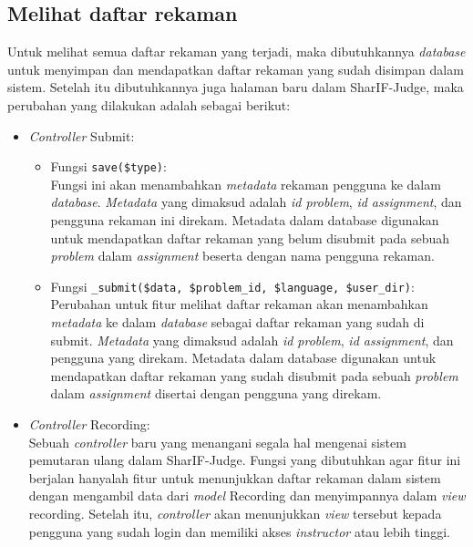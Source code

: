 \subsection{Melihat daftar rekaman}
\label{sub:4:3:melihatdaftarrekaman}

Untuk melihat semua daftar rekaman yang terjadi, maka dibutuhkannya \textit{database} untuk menyimpan dan mendapatkan daftar rekaman yang sudah disimpan dalam sistem. Setelah itu dibutuhkannya juga halaman baru dalam SharIF-Judge, maka perubahan yang dilakukan adalah sebagai berikut:

\begin{itemize}
    \item \textit{Controller} Submit:
          \begin{itemize}
              \item Fungsi \verb|save($type)|: \\
                    Fungsi ini akan menambahkan \textit{metadata} rekaman pengguna ke dalam \textit{database}. \textit{Metadata} yang dimaksud adalah \textit{id problem}, \textit{id assignment}, dan pengguna rekaman ini direkam. Metadata dalam database digunakan untuk mendapatkan daftar rekaman yang belum disubmit pada sebuah \textit{problem} dalam \textit{assignment} beserta dengan nama pengguna rekaman.
              \item Fungsi \verb|_submit($data, $problem_id, $language, $user_dir)|: \\
                    Perubahan untuk fitur melihat daftar rekaman akan menambahkan \textit{metadata} ke dalam \textit{database} sebagai daftar rekaman yang sudah di submit. \textit{Metadata} yang dimaksud adalah \textit{id problem}, \textit{id assignment}, dan pengguna yang direkam. Metadata dalam database digunakan untuk mendapatkan daftar rekaman yang sudah disubmit pada sebuah \textit{problem} dalam \textit{assignment} disertai dengan pengguna yang direkam.
          \end{itemize}
    \item \textit{Controller} Recording: \\
          Sebuah \textit{controller} baru yang menangani segala hal mengenai sistem pemutaran ulang dalam SharIF-Judge. Fungsi yang dibutuhkan agar fitur ini berjalan hanyalah fitur untuk menunjukkan daftar rekaman dalam sistem dengan mengambil data dari \textit{model} Recording dan menyimpannya dalam \textit{view} recording. Setelah itu, \textit{controller} akan menunjukkan \textit{view} tersebut kepada pengguna yang sudah login dan memiliki akses \textit{instructor} atau lebih tinggi.

\end{itemize}
